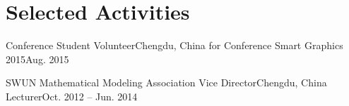 \section{\textbf{Selected Activities}}
  \resumeSubHeadingListStart

    \resumeSubheading
        {Conference Student Volunteer}{Chengdu, China}
        {for Conference Smart Graphics 2015}{Aug. 2015}

    \resumeSubheading
        {SWUN Mathematical Modeling Association Vice Director}{Chengdu, China}
        {Lecturer}{Oct. 2012 -- Jun. 2014}

  \resumeSubHeadingListEnd